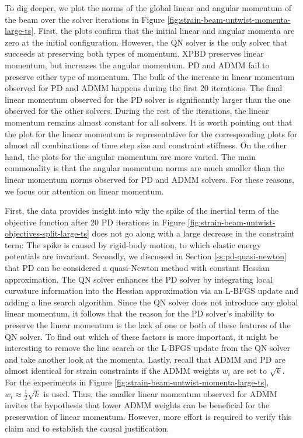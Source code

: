To dig deeper, we plot the norms of the global linear and angular momentum of the beam over the solver iterations in 
Figure \ref{fig:strain-beam-untwist-momenta-large-ts}. First, the plots confirm that the initial linear and angular momenta are zero at the initial 
configuration. However, the QN solver is the only solver that succeeds at preserving both types of momentum. XPBD preserves linear momentum, 
but increases the angular momentum. PD and ADMM fail to preserve either type of momentum. The bulk of the 
increase in linear momentum observed for PD and ADMM happens during the first 20 iterations. The final linear momentum observed for the PD solver is 
significantly larger than the one observed for the other solvers. During the rest of the iterations, the linear momentum remains almost constant for all solvers. 
It is worth pointing out that the plot for the linear momentum is representative for the corresponding plots for almost all combinations of time step size and 
constraint stiffness. On the other hand, the plots for the angular momentum are more varied. The main commonality is that the angular momentum norms are much 
smaller than the linear momentum norms observed for PD and ADMM solvers. For these reasons, we focus our attention on linear momentum. 

First, the data provides insight into why the spike of the inertial term of the objective function after 20 PD iterations in 
Figure \ref{fig:strain-beam-untwist-objectives-split-large-ts} does not go along with a large decrease in the constraint term: The spike is caused by 
rigid-body motion, to which elastic energy potentials are invariant. Secondly, we discussed in Section \ref{ss:pd-quasi-newton} that PD can be considered 
a quasi-Newton method with constant Hessian approximation. The QN solver enhances the PD solver by integrating local curvature information into the Hessian 
approximation via an L-BFGS update and adding a line search algorithm. Since the QN solver does not introduce any global linear momentum, it follows that
the reason for the PD solver's inability to preserve the linear momentum is the lack of one or both of these features of the QN solver. To find out which of 
these factors is more important, it might be interesting to remove the line search or the L-BFGS update from the QN solver and take another look at the momenta. 
Lastly, recall that ADMM and PD are almost identical for strain constraints if the ADMM weights $w_i$ are set to $\sqrt{k}$. For the experiments in 
Figure \ref{fig:strain-beam-untwist-momenta-large-ts}, $w_i \approx \frac{1}{2}\sqrt{k}$ is used. Thus, the smaller linear momentum observed for ADMM invites 
the hypothesis that lower ADMM weights can be beneficial for the preservation of linear momentum. However, more effort is required to verify this claim and 
to establish the causal justification. 

